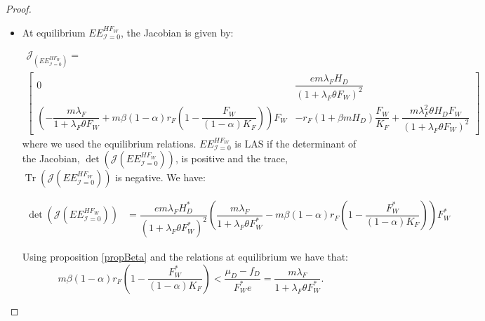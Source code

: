 \documentclass{article}
\newcommand{\lfw}{\lambda_{F}}
\newcommand{\lfw}{\lambda_{F}}
\newcommand{\cI}{\mathcal{I}}
\DeclareMathOperator{\Tr}{Tr}
\begin{document}
\begin{proof}
\begin{itemize}
%
%
%



\item At equilibrium $EE^{HF_W}_{\cI = 0}$, the Jacobian is given by:

\begin{multline*}
\mathcal{J}_(EE^{HF_W}_{\cI = 0}) = \\ \begin{bmatrix}
0 & \dfrac{e m \lfw H_D}{(1 + \lfw \theta F_W)^2}  \\
\left(- \dfrac{m \lfw}{1 + \lfw \theta F_W} + m\beta (1-\alpha) r_F \left(1 -\dfrac{F_W}{(1-\alpha) K_F} \right) \right) F_W &
- r_F(1+\beta m H_D) \dfrac{F_W}{K_F} +  \dfrac{ m \lfw^2 \theta H_D F_W}{(1 + \lfw \theta F_W)^2}
\end{bmatrix}
\end{multline*}
where we used the equilibrium relations. $EE^{HF_W}_{\cI = 0}$ is LAS if the determinant of the Jacobian, $ \det(\mathcal{J}(EE^{HF_W}_{\cI = 0}))$, is positive and the trace, $\Tr(\mathcal{J}(EE^{HF_W}_{\cI = 0}))$ is negative. We have:

\begin{align*}
\det(\mathcal{J}(EE^{HF_W}_{\cI = 0})) &= \dfrac{e m \lfw H_D^*}{(1 + \lfw \theta F_W^*)^2}\left(\dfrac{m \lfw}{1 + \lfw \theta F_W^*} - m\beta (1-\alpha) r_F \left(1 -\dfrac{F_W^*}{(1-\alpha) K_F} \right) \right) F_W^* 
\end{align*}

Using proposition \ref{propBeta} and the relations at equilibrium we have that:
$$m\beta (1-\alpha) r_F \left(1 -\dfrac{F_W^*}{(1-\alpha) K_F} \right) < \dfrac{\mu_D - f_D}{F_W^* e} = \dfrac{m \lfw}{1 + \lfw \theta F_W^*}.$$ 


\end{itemize}
\end{proof}
\end{document}
